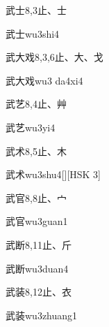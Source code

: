 \begin{Entry}{武士}{8,3}{⽌、⼠}
  \begin{Phonetics}{武士}{wu3shi4}
  \end{Phonetics}
\end{Entry}

\begin{Entry}{武大戏}{8,3,6}{⽌、⼤、⼽}
  \begin{Phonetics}{武大戏}{wu3 da4xi4}
  \end{Phonetics}
\end{Entry}

\begin{Entry}{武艺}{8,4}{⽌、⾋}
  \begin{Phonetics}{武艺}{wu3yi4}
  \end{Phonetics}
\end{Entry}

\begin{Entry}{武术}{8,5}{⽌、⽊}
  \begin{Phonetics}{武术}{wu3shu4}[][HSK 3]
  \end{Phonetics}
\end{Entry}

\begin{Entry}{武官}{8,8}{⽌、⼧}
  \begin{Phonetics}{武官}{wu3guan1}
  \end{Phonetics}
\end{Entry}

\begin{Entry}{武断}{8,11}{⽌、⽄}
  \begin{Phonetics}{武断}{wu3duan4}
  \end{Phonetics}
\end{Entry}

\begin{Entry}{武装}{8,12}{⽌、⾐}
  \begin{Phonetics}{武装}{wu3zhuang1}
  \end{Phonetics}
\end{Entry}

